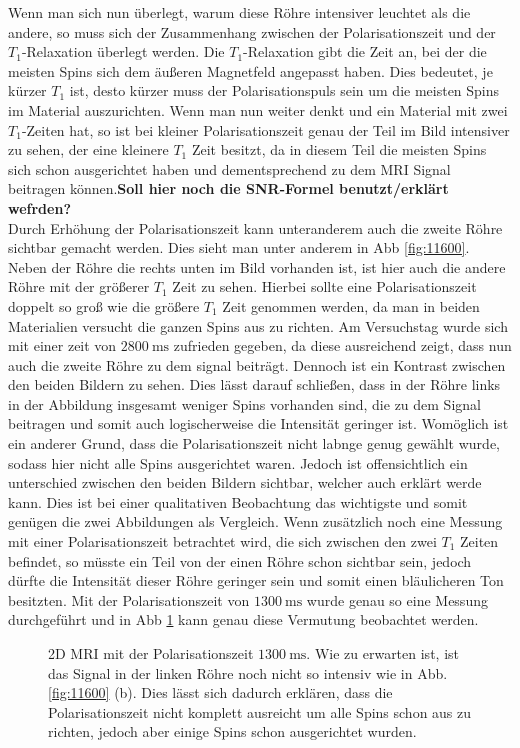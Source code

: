 Wenn man sich nun überlegt, warum diese Röhre intensiver leuchtet als die andere, so muss sich der Zusammenhang zwischen der Polarisationszeit und der $T_1$-Relaxation überlegt werden. Die $T_1$-Relaxation gibt die Zeit an, bei der die meisten Spins sich dem äußeren Magnetfeld angepasst haben. Dies bedeutet, je kürzer $T_1$ ist, desto kürzer muss der Polarisationspuls sein um die meisten Spins im Material auszurichten. Wenn man nun weiter denkt und ein Material mit zwei $T_1$-Zeiten hat, so ist bei kleiner Polarisationszeit genau der Teil im Bild intensiver zu sehen, der eine kleinere $T_1$ Zeit besitzt, da in diesem Teil die meisten Spins sich schon ausgerichtet haben und dementsprechend zu dem MRI Signal beitragen können.\textbf{Soll hier noch die SNR-Formel benutzt/erklärt wefrden?}\\
Durch Erhöhung der Polarisationszeit kann unteranderem auch die zweite Röhre sichtbar gemacht werden. Dies sieht man unter anderem in Abb \ref{fig:11600}. Neben der Röhre die rechts unten im Bild vorhanden ist, ist hier auch die andere Röhre mit der größerer $T_1$ Zeit zu sehen. Hierbei sollte eine Polarisationszeit doppelt so groß wie die größere $T_1$ Zeit genommen werden, da man in beiden Materialien versucht die ganzen Spins aus zu richten. Am Versuchstag wurde sich mit einer zeit von $\SI{2800}{\milli\second}$ zufrieden gegeben, da diese ausreichend zeigt, dass nun auch die zweite Röhre zu dem signal beiträgt. Dennoch ist ein Kontrast zwischen den beiden Bildern zu sehen. Dies lässt darauf schließen, dass in der Röhre links in der Abbildung insgesamt weniger Spins vorhanden sind, die zu dem Signal beitragen und somit auch logischerweise die Intensität geringer ist. Womöglich ist ein anderer Grund, dass die Polarisationszeit nicht labnge genug gewählt wurde, sodass hier nicht alle Spins ausgerichtet waren. Jedoch ist offensichtlich ein unterschied zwischen den beiden Bildern sichtbar, welcher auch erklärt werde kann. Dies ist bei einer qualitativen Beobachtung das wichtigste und somit genügen die zwei Abbildungen als Vergleich. Wenn zusätzlich noch eine Messung mit einer Polarisationszeit betrachtet wird, die sich zwischen den zwei $T_1$ Zeiten befindet, so müsste ein Teil von der einen Röhre schon sichtbar sein, jedoch dürfte die Intensität dieser Röhre geringer sein und somit einen bläulicheren Ton besitzten. Mit der Polarisationszeit von $\SI{1300}{\milli\second}$ wurde genau so eine Messung durchgeführt und in Abb \ref{fig: 1300} kann genau diese Vermutung beobachtet werden.
    \begin{figure}[H]
        \centering
        
        \caption[2D MRI mit der Polarisationszeit $\SI{1300}{\milli\second}$]{2D MRI mit der Polarisationszeit $\SI{1300}{\milli\second}$. Wie zu erwarten ist, ist das Signal in der linken Röhre noch nicht so intensiv wie in Abb. \ref{fig:11600} (b). Dies lässt sich dadurch erklären, dass die Polarisationszeit nicht komplett ausreicht um alle Spins schon aus zu richten, jedoch aber einige Spins schon ausgerichtet wurden.}
        \label{fig: 1300}
    \end{figure}
